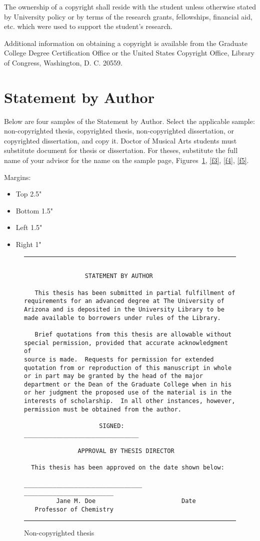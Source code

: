 \documentclass[draft]{ua-thesis}
\begin{document}
The ownership of a copyright shall reside with the student unless otherwise
stated by University policy or by terms of the research grants, fellowships,
financial aid, etc. which were used to support the student's research.

Additional information on obtaining a copyright is available from the
Graduate College Degree Certification Office or the United States Copyright
Office, Library of Congress, Washington, D. C. 20559.


\section{Statement by Author}

Below are four samples of the Statement by Author. Select the applicable
sample: non-copyrighted thesis, copyrighted thesis, non-copyrighted
dissertation, or copyrighted dissertation, and copy it. Doctor of Musical
Arts students must substitute document for thesis or dissertation. For
theses, substitute the full name of your advisor for the name on the sample
page, Figures~\ref{f2}, \ref{f3}, \ref{f4}, \ref{f5}.

Margins:
\begin{itemize}
   \item Top 2.5"
   \item Bottom 1.5"
   \item Left 1.5"
   \item Right 1"
\end{itemize}


\begin{figure}
\hrule
\begin{verbatim}

                 STATEMENT BY AUTHOR

   This thesis has been submitted in partial fulfillment of
requirements for an advanced degree at The University of
Arizona and is deposited in the University Library to be
made available to borrowers under rules of the Library.

   Brief quotations from this thesis are allowable without
special permission, provided that accurate acknowledgment of
source is made.  Requests for permission for extended
quotation from or reproduction of this manuscript in whole
or in part may be granted by the head of the major
department or the Dean of the Graduate College when in his
or her judgment the proposed use of the material is in the
interests of scholarship.  In all other instances, however,
permission must be obtained from the author.

                     SIGNED: ________________________________

               APPROVAL BY THESIS DIRECTOR

  This thesis has been approved on the date shown below:

_________________________________  _________________________
         Jane M. Doe                        Date
   Professor of Chemistry

\end{verbatim}
\hrule
\caption{Non-copyrighted thesis} \label{f2}
\end{figure}
\end{document}
